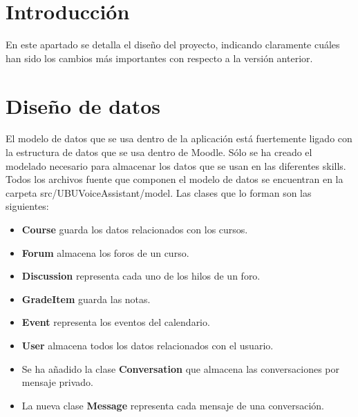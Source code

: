 
\section{Introducción}
En este apartado se detalla el diseño del proyecto, indicando claramente cuáles han sido los cambios más importantes con respecto a la versión anterior.

\section{Diseño de datos}
El modelo de datos que se usa dentro de la aplicación está fuertemente ligado con la estructura de datos que se usa dentro de Moodle. Sólo se ha creado el modelado necesario para almacenar los datos que se usan en las diferentes skills. Todos los archivos fuente que componen el modelo de datos se encuentran en la carpeta src/UBUVoiceAssistant/model. Las clases que lo forman son las siguientes:

\begin{itemize}
    \item \textbf{Course} guarda los datos relacionados con los cursos.
    \item \textbf{Forum} almacena los foros de un curso.
    \item \textbf{Discussion} representa cada uno de los hilos de un foro.
    \item \textbf{GradeItem} guarda las notas.
    \item \textbf{Event} representa los eventos del calendario.
    \item \textbf{User} almacena todos los datos relacionados con el usuario.
    \item Se ha añadido la clase \textbf{Conversation} que almacena las conversaciones por mensaje privado.
    \item La nueva clase \textbf{Message} representa cada mensaje de una conversación.
\end{itemize}


